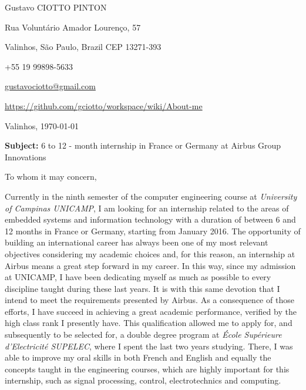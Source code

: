 \documentclass[12pt, a4paper]{article}
\begin{document}
\pagestyle{empty} 

Gustavo CIOTTO PINTON

Rua Voluntário Amador Lourenço, 57

Valinhos, São Paulo, Brazil CEP 13271-393

+55 19 99898-5633

 \url{gustavociotto@gmail.com}

\url{https://github.com/gciotto/workspace/wiki/About-me}
\begin{flushright}
\vspace{-12pt}
Valinhos,  \today





\end{flushright}

\textbf{Subject:} 6 to 12 - month internship in France or Germany at Airbus
Group Innovations 

\vspace{12pt} 

To whom it may concern, 

\vspace{12pt}
Currently in the ninth semester of the computer engineering course at
\textit{University of Campinas UNICAMP}, I am looking for an internship related
to the areas of embedded systems and information technology with  a duration of
between 6 and 12 months in France or Germany, starting from January 2016. The
opportunity of building an international career has always been one of my most
relevant objectives considering my academic choices and, for this reason, an
internship at Airbus means a great step forward in my career. In this
way, since my admission at UNICAMP, I have been dedicating myself as much as possible to every
discipline taught during these last years. It is with this same devotion that I
intend to meet the requirements presented by Airbus. As a consequence of those
efforts, I have succeed in achieving a great academic performance, verified by
the high class rank I presently have. This qualification allowed me to apply
for, and subsequently to be selected for, a double degree program at
\textit{École Supérieure d'Electricité SUPELEC}, where I spent the last two
years studying. There, I was able to improve my oral skills in both French and English and
equally the concepts taught in the engineering courses, which are highly
important for this internship, such as signal processing, control,
electrotechnics and computing.
\end{document}
